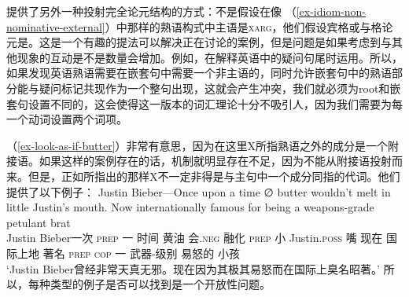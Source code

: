 \citet[\S~6]{KSF2015a}提供了另外一种投射完全论元结构的方式：不是假设在像 （\ref{ex-idiom-non-nominative-external}）中那样的熟语构式中主语是\textsc{xarg}，他们假设宾格或与格论元是\xargc。这是一个有趣的提法可以解决正在讨论的案例，但是问题是如果考虑到与其他现象的互动是不是数量会增加。例如，\citet{BF99a}在解释英语中的疑问句尾时运用\xargc。所以，如果发现英语熟语需要在嵌套句中需要一个非主语的\xargc，同时允许嵌套句中的熟语部分能与疑问标记共现作为一个整句出现，这就会产生冲突，我们就必须为root和嵌套句设置不同的\xargc，这会使得这一版本的词汇理论十分不吸引人，因为我们需要为每一个动词设置两个词项。

（\ref{ex-look-as-if-butter}）非常有意思，因为在这里X所指熟语之外的成分是一个附接语。如果这样的案例存在的话，\xargc 机制就明显存在不足，因为\xargc 不能从附接语投射而来。但是，正如\citet{KSF2015a}所指出的那样X不一定非得是与主句中一个成分同指的代词。他们提供了以下例子：
\ea
\gll Justin Bieber—Once upon a time ∅ butter wouldn't melt in little Justin's mouth. Now internationally famous for being a weapons-grade petulant brat\\    %
     Justin Bieber一次 \textsc{prep} 一 时间 {} 黄油 会.\textsc{neg} 融化 \textsc{prep} 小 Justin.\textsc{poss} 嘴 现在 国际上地 著名 \textsc{prep} \textsc{cop} 一 武器-级别 易怒的 小孩\\
\glt `Justin Bieber曾经非常天真无邪。现在因为其极其易怒而在国际上臭名昭著。'
\z
所以，每种类型的例子是否可以找到是一个开放性问题。

